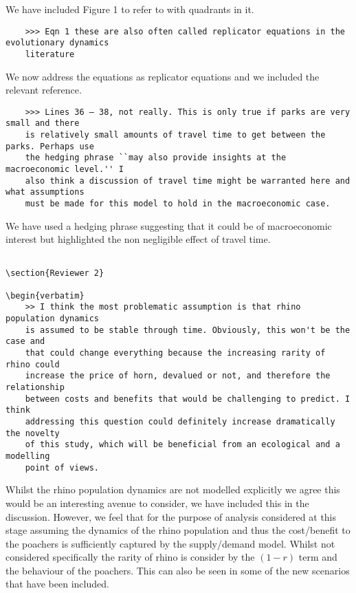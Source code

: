 \documentclass[10pt]{article}
\begin{document}
We have included Figure 1 to refer to with quadrants in it.

\begin{verbatim}
    >>> Eqn 1 these are also often called replicator equations in the evolutionary dynamics
    literature
\end{verbatim}

We now address the equations as replicator equations and we included the relevant
reference.

\begin{verbatim}
    >>> Lines 36 – 38, not really. This is only true if parks are very small and there
    is relatively small amounts of travel time to get between the parks. Perhaps use
    the hedging phrase ``may also provide insights at the macroeconomic level.'' I
    also think a discussion of travel time might be warranted here and what assumptions
    must be made for this model to hold in the macroeconomic case.
\end{verbatim}

We have used a hedging phrase suggesting that it could be of macroeconomic
interest but highlighted the non negligible effect of travel time.

\begin{verbatim}

\section{Reviewer 2}

\begin{verbatim}
    >> I think the most problematic assumption is that rhino population dynamics
    is assumed to be stable through time. Obviously, this won't be the case and
    that could change everything because the increasing rarity of rhino could
    increase the price of horn, devalued or not, and therefore the relationship
    between costs and benefits that would be challenging to predict. I think
    addressing this question could definitely increase dramatically the novelty
    of this study, which will be beneficial from an ecological and a modelling
    point of views.
\end{verbatim}

Whilst the rhino population dynamics are not modelled explicitly we agree this
would be an interesting avenue to consider, we have included this in the
discussion. However, we feel that for the purpose of analysis considered at this
stage assuming the dynamics of the rhino population and thus the cost/benefit to
the poachers is sufficiently captured by the supply/demand model. Whilst not
considered specifically the rarity of rhino is consider by the \((1-r)\) term
and the behaviour of the poachers. This can also be seen in some of the new
scenarios that have been included.
\end{document}
